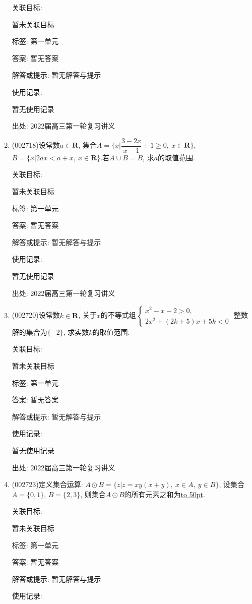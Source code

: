 \documentclass[10pt,a4paper]{article}
\newcommand{\blank}[1]{\underline{\hbox to #1pt{}}}
\begin{document}
\begin{enumerate}[1.]
关联目标:

暂未关联目标



标签: 第一单元

答案: 暂无答案

解答或提示: 暂无解答与提示

使用记录:

暂无使用记录


出处: 2022届高三第一轮复习讲义
\item { (002718)}设常数$a\in \mathbf{R}$, 集合$A=\{x|\dfrac{3-2x}{x-1}+1 \ge 0, \ x\in \mathbf{R}\}$, $B=\{x|2ax<a+x, \ x\in \mathbf{R} \}$.若$A\cup B=B$, 求$a$的取值范围.


关联目标:

暂未关联目标



标签: 第一单元

答案: 暂无答案

解答或提示: 暂无解答与提示

使用记录:

暂无使用记录


出处: 2022届高三第一轮复习讲义
\item { (002720)}设常数$k\in \mathbf{R}$, 关于$x$的不等式组$\begin{cases} x^2-x-2>0, \\ 2x^2+(2k+5)x+5k<0 \end{cases}$ 整数解的集合为$\{-2\}$, 求实数$k$的取值范围.


关联目标:

暂未关联目标



标签: 第一单元

答案: 暂无答案

解答或提示: 暂无解答与提示

使用记录:

暂无使用记录


出处: 2022届高三第一轮复习讲义
\item { (002723)}定义集合运算: $A\odot B=\{z|z=xy(x+y), \ x\in A, \ y\in B \}$, 设集合$A=\{0,1\}$, $B=\{2,3\}$, 则集合$A\odot B$的所有元素之和为\blank{50}.


关联目标:

暂未关联目标



标签: 第一单元

答案: 暂无答案

解答或提示: 暂无解答与提示

使用记录:


\end{enumerate}
\end{document}
